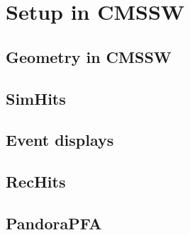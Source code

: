 \section{Setup in CMSSW}
\label{sec:cmssw}

\subsection{Geometry in CMSSW}

\subsection{SimHits}

\subsection{Event displays}

\subsection{RecHits}

\subsection{PandoraPFA}
